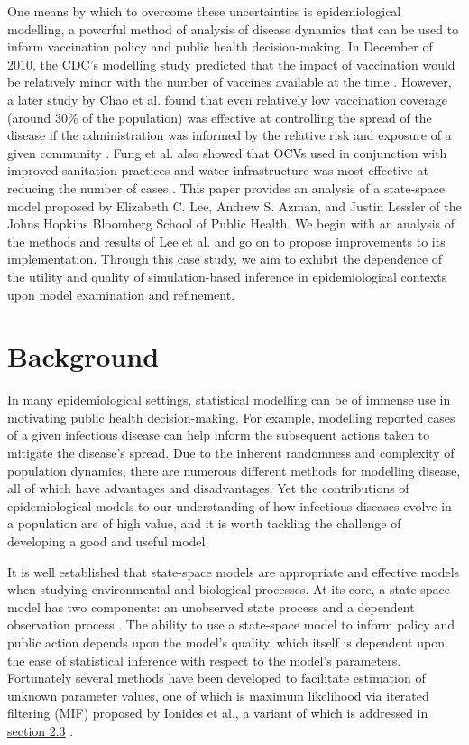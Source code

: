 \documentclass[12pt]{article}
\begin{document}
  One means by which to overcome these uncertainties is epidemiological modelling, a powerful method of analysis of disease dynamics that can be used to inform vaccination policy and public health decision-making. In December of 2010, the CDC's modelling study predicted that the impact of vaccination would be relatively minor with the number of vaccines available at the time \cite{date}. However, a later study by Chao et al. found that even relatively low vaccination coverage (around 30\% of the population) was effective at controlling the spread of the disease if the administration was informed by the relative risk and exposure of a given community \cite{chao}. Fung et al. also showed that OCVs used in conjunction with improved sanitation practices and water infrastructure was most effective at reducing the number of cases \cite{fung}. This paper provides an analysis of a state\hyp{}space model proposed by Elizabeth C. Lee, Andrew S. Azman, and Justin Lessler of the Johns Hopkins Bloomberg School of Public Health. We begin with an analysis of the methods and results of Lee et al. and go on to propose improvements to its implementation. Through this case study, we aim to exhibit the dependence of the utility and quality of simulation-based inference in epidemiological contexts upon model examination and refinement.

\section{Background}

 In many epidemiological settings, statistical modelling can be of immense use in motivating public health decision-making. For example, modelling reported cases of a given infectious disease can help inform the subsequent actions taken to mitigate the disease's spread. Due to the inherent randomness and complexity of population dynamics, there are numerous different methods for modelling disease, all of which have advantages and disadvantages. Yet the contributions of epidemiological models to our understanding of how infectious diseases evolve in a population are of high value, and it is worth tackling the challenge of developing a good and useful model.
  
  It is well established that state\hyp{}space models are appropriate and effective models when studying environmental and biological processes. At its core, a state\hyp{}space model has two components: an unobserved state process and a dependent observation process \cite{Ionides_infdynsys}. The ability to use a state\hyp{}space model to inform policy and public action depends upon the model's quality, which itself is dependent upon the ease of statistical inference with respect to the model's parameters. Fortunately several methods have been developed to facilitate estimation of unknown parameter values, one of which is maximum likelihood via iterated filtering (MIF) proposed by Ionides et al., a variant of which is addressed in \hyperref[sec:like]{section 2.3} \cite{Ionides_if}.
  
\end{document}
